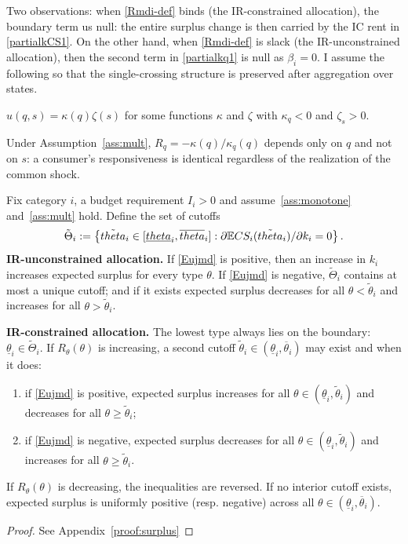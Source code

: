 \documentclass{class}
\begin{document}
Two observations: when \ref{Rmdi-def} binds (the IR-constrained allocation), the boundary term us null: the entire surplus change is then carried by the IC rent in \ref{partialkCS1}. On the other hand,  when \ref{Rmdi-def} is slack (the IR-unconstrained allocation), then the second term in \ref{partialkq1} is null as $\beta_i = 0$. I assume the following so that the single-crossing structure is preserved after aggregation over states.

\renewcommand{\theassumption}{Multi}
\begin{assumption}\label{ass:mult}
$u(q,s) = \kappa(q)\zeta(s)$ for some functions $\kappa$ and $\zeta$ with $\kappa_q < 0$ and $\zeta_s > 0$.
\end{assumption}
\renewcommand{\theassumption}{\arabic{assumption}}

Under Assumption~\ref{ass:mult}, $R_q = -\kappa(q)/\kappa_q(q)$ depends only on $q$ and not on $s$: a consumer's responsiveness is identical regardless of the realization of the common shock.

\begin{theorem}\label{thm:surplus}
Fix category \(i\), a budget requirement \(I_i>0\) and assume~\ref{ass:monotone} and~\ref{ass:mult} hold. Define the set of cutoffs 
\[\tilde\Theta_i := \left\{\tilde{theta}_i\in[\underline{theta}_i,\overline{theta}_i] : \partial\mathbb{E} CS_i(\tilde{theta}_i)/\partial k_i=0\right\}.\]
\noindent\textbf{IR-unconstrained allocation.} If \ref{Eujmd} is positive, then an increase in \(k_i\) increases expected surplus for every type \(\theta\). If \ref{Eujmd} is negative, \(\tilde\Theta_i\) contains at most a unique cutoff; and if it exists expected surplus decreases for all \(\theta<\tilde\theta_i\) and increases for all \(\theta>\tilde\theta_i\).

\noindent\textbf{IR-constrained allocation.} The lowest type always lies on the boundary: \(\underline\theta_i\in\tilde\Theta_i\). If \(R_\theta(\theta)\) is increasing, a second cutoff \(\tilde\theta_i\in(\underline\theta_i,\overline\theta_i)\) may exist and when it does:
\begin{enumerate}[label=(\roman*), leftmargin=1cm]
    \item if \ref{Eujmd} is positive, expected surplus increases for all \(\theta\in(\underline\theta_i,\tilde\theta_i)\) and decreases for all \(\theta\ge\tilde\theta_i\);
    \item if \ref{Eujmd} is negative, expected surplus decreases for all \(\theta\in(\underline\theta_i,\tilde\theta_i)\) and increases for all \(\theta\ge\tilde\theta_i\).
\end{enumerate}
If \(R_\theta(\theta)\) is decreasing, the inequalities are reversed. If no interior cutoff exists, expected surplus is uniformly positive (resp. negative) across all $\theta \in (\underline\theta_i, \overline\theta_i)$.
\end{theorem}
\begin{proof}
    See Appendix~\ref{proof:surplus}
\end{proof}
\end{document}
